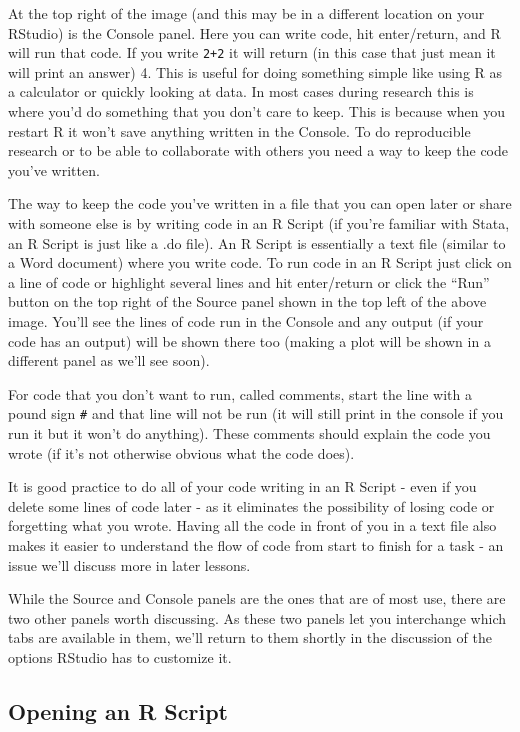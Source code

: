 \documentclass[
  a4paper,
]{krantz}
\begin{document}
At the top right of the image (and this may be in a
different location on your RStudio) is the Console panel.
Here you can write code, hit enter/return, and R will run
that code. If you write \texttt{2+2} it will return (in this
case that just mean it will print an answer) 4. This is
useful for doing something simple like using R as a
calculator or quickly looking at data. In most cases during
research this is where you'd do something that you don't
care to keep. This is because when you restart R it won't
save anything written in the Console. To do reproducible
research or to be able to collaborate with others you need a
way to keep the code you've written.

The way to keep the code you've written in a file that you
can open later or share with someone else is by writing code
in an R Script (if you're familiar with Stata, an R Script
is just like a .do file). An R Script is essentially a text
file (similar to a Word document) where you write code. To
run code in an R Script just click on a line of code or
highlight several lines and hit enter/return or click the
``Run'' button on the top right of the Source panel shown in
the top left of the above image. You'll see the lines of
code run in the Console and any output (if your code has an
output) will be shown there too (making a plot will be shown
in a different panel as we'll see soon).

For code that you don't want to run, called comments, start
the line with a pound sign \texttt{\#} and that line will
not be run (it will still print in the console if you run it
but it won't do anything). These comments should explain the
code you wrote (if it's not otherwise obvious what the code
does).

It is good practice to do all of your code writing in an R
Script - even if you delete some lines of code later - as it
eliminates the possibility of losing code or forgetting what
you wrote. Having all the code in front of you in a text
file also makes it easier to understand the flow of code
from start to finish for a task - an issue we'll discuss
more in later lessons.

While the Source and Console panels are the ones that are of
most use, there are two other panels worth discussing. As
these two panels let you interchange which tabs are
available in them, we'll return to them shortly in the
discussion of the options RStudio has to customize it.

\hypertarget{opening-an-r-script}{%
\subsection{Opening an R Script}\label{opening-an-r-script}}
\end{document}

